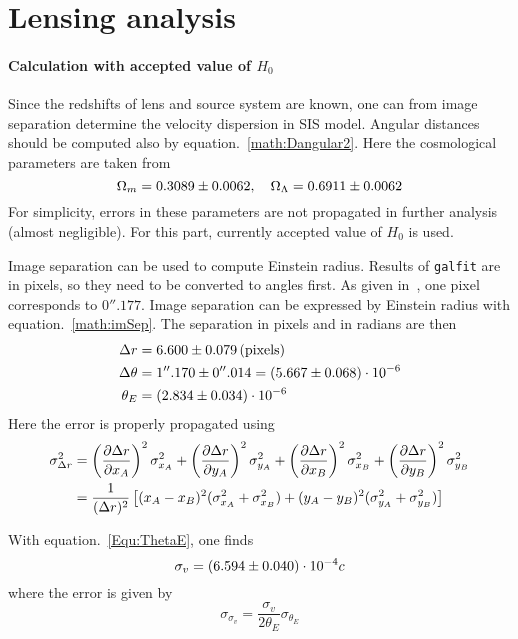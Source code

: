 \clearpage
\section{Lensing analysis} 
\paragraph{Calculation with accepted value of $H_0$}
Since the redshifts of lens and source system are known, one can from image separation determine the velocity dispersion in SIS model. Angular distances should be computed also by equation.~\ref{math:Dangular2}. Here the cosmological parameters are taken from~\cite{planck}
\begin{equation*}
	\Omega_m = \num{0.3089 +- 0.0062}, \quad \Omega_\Lambda=\num{0.6911 +- 0.0062}
\end{equation*}
For simplicity, errors in these parameters are not propagated in further analysis (almost negligible). For this part, currently accepted value of $H_0$ is used.

Image separation can be used to compute Einstein radius. Results of \verb|galfit| are in pixels, so they need to be converted to angles first. As given in~\cite{manual}, one pixel corresponds to $0''.177$. Image separation can be expressed by Einstein radius with equation.~\ref{math:imSep}. The separation in pixels and in radians are then
\begin{align*}
	\Delta r &= \num{6.60 +- 0.079} \, \text{(pixels)} \\
	\Delta \theta &= 1''.170 \pm 0''.014 =  (\num{5.667 +- 0.068}) \cdot 10^{-6}\\
	\theta_E &= (\num{2.834 +- 0.034}) \cdot 10^{-6}
\end{align*}
Here the error is properly propagated using
\begin{align*}
	\sigma_{\Delta r} ^2 &= \left( \pdv{\Delta r}{x_A}  \right)^2 \sigma_{x_A}^2 + \left( \pdv{\Delta r}{y_A}  \right)^2 \sigma_{y_A}^2 + \left( \pdv{\Delta r}{x_B}  \right)^2 \sigma_{x_B}^2 + \left( \pdv{\Delta r}{y_B}  \right)^2 \sigma_{y_B}^2 \\
								&= \frac{1}{(\Delta r)^2} \left[ (x_A - x_B)^2(\sigma_{x_A}^2 + \sigma_{x_B}^2) + (y_A - y_B)^2 (\sigma_{y_A}^2 + \sigma_{y_B}^2) \right]
\end{align*}

With equation.~\ref{Equ:ThetaE}, one finds
\begin{equation}
	\sigma_v = (\num{6.594 +- 0.040 })\cdot 10^{-4} c
\end{equation}
where the error is given by
\begin{equation*}
	\sigma_{\sigma_v} = \frac{\sigma_v}{2\theta_E} \sigma_{\theta_E}
\end{equation*}

